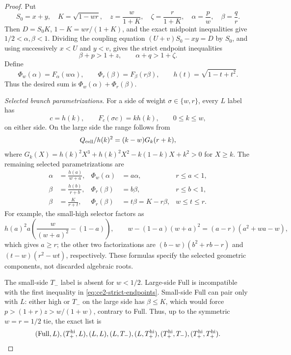 \begin{proof}
Put
\[
 S_0=x+y,\quad K=\sqrt{1-wr},\quad
 z=\frac{w}{1+K},\quad\zeta=\frac{r}{1+K},
 \quad\alpha=\frac pw,\quad\beta=\frac qr.
\]
Then $D=S_0K$, $1-K=wr/(1+K)$, and the exact midpoint inequalities give
$1/2<\alpha,\beta<1$.  Dividing the coupling equation
$(U+v)S_0-xy=D$ by $S_0$, and using successively $x<U$ and $y<v$, gives
the strict endpoint inequalities
\begin{equation}
 \beta+p>1+z,\qquad \alpha+q>1+\zeta.
 \label{eq:ce2-strict-endpoints}
\end{equation}
Define
\[
 \Phi_w(\alpha)=F_\alpha(w\alpha),\qquad
 \Phi_r(\beta)=F_\beta(r\beta),\qquad
 h(t)=\sqrt{1-t+t^2}.
\]
Thus the desired sum is $\Phi_w(\alpha)+\Phi_r(\beta)$.

\smallskip\noindent
\emph{Selected branch parametrizations.}
For a side of weight $\sigma\in\{w,r\}$, every $L$ label has
\begin{equation}
 c=h(k),\qquad F_c(\sigma c)=kh(k),\qquad0\le k\le w,
 \label{eq:two-endpoint-L-param}
\end{equation}
on either side.  On the large side the range follows from
\[
 Q_{\rm cell}/h(k)^2=(k-w)G_k(r+k),
\]
where
$G_k(X)=h(k)^2X^3+h(k)^2X^2-k(1-k)X+k^2>0$ for $X\ge k$.
The remaining selected parametrizations are
\begin{align}
 \alpha&=\frac{h(a)}{w+a},&
 \Phi_w(\alpha)&=a\alpha,& r\le a<1,
 \label{eq:two-endpoint-small-high}\\
 \beta&=\frac{h(b)}{r+b},&
 \Phi_r(\beta)&=b\beta,& r\le b<1,
 \label{eq:two-endpoint-large-high}\\
 \beta&=\frac K{r+t},&
 \Phi_r(\beta)&=t\beta=K-r\beta,& w\le t\le r.
 \label{eq:two-endpoint-large-tminus}
\end{align}
For example, the small-high selector factors as
\[
 h(a)^2a\left(\frac{w}{(w+a)^2}-(1-a)\right),\qquad
 w-(1-a)(w+a)^2=(a-r)(a^2+wa-w),
\]
which gives $a\ge r$; the other two factorizations are
$(b-w)(b^2+rb-r)$ and $(t-w)(r^2-wt)$, respectively.  These formulas
specify the selected geometric components, not discarded algebraic roots.

The small-side $T_-$ label is absent for $w<1/2$.  Large-side Full is
incompatible with the first inequality in
\eqref{eq:ce2-strict-endpoints}.  Small-side Full can pair only with $L$:
either high or $T_-$ on the large side has $\beta\le K$, which would force
$p>(1+r)z>w/(1+w)$, contrary to Full.  Thus, up to the symmetric
$w=r=1/2$ tie, the exact list is
\begin{equation}
 (\mathrm{Full},L),(T_+^{\rm hi},L),(L,L),(L,T_-),
 (L,T_+^{\rm hi}),(T_+^{\rm hi},T_-),(T_+^{\rm hi},T_+^{\rm hi}).
 \label{eq:two-endpoint-pairs}
\end{equation}


\end{proof}
